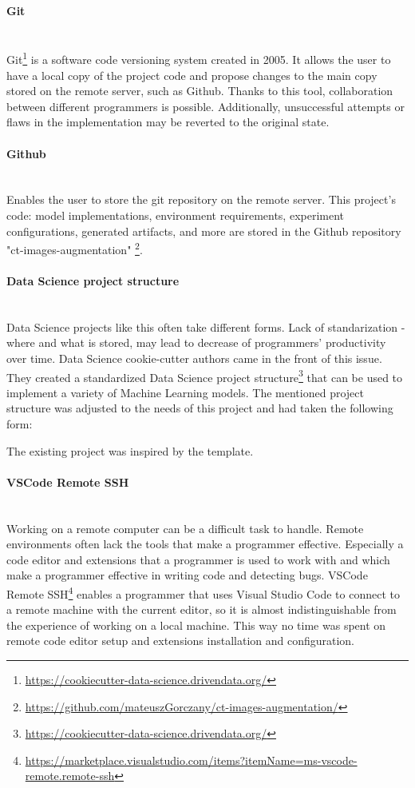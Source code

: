 \paragraph{Git}\mbox{}\\
\indent Git\footnote{\url{https://cookiecutter-data-science.drivendata.org/}} is a software code versioning system created in 2005. It allows the user to have a local copy of the project code and propose changes to the main copy stored on the remote server, such as Github. Thanks to this tool, collaboration between different programmers is possible. Additionally, unsuccessful attempts or flaws in the implementation may be reverted to the original state.
\paragraph{Github}\mbox{}\\
\indent Enables the user to store the git repository on the remote server. 
This project's code: model implementations, environment requirements, experiment configurations, generated artifacts, and more are stored in the Github repository "ct-images-augmentation" \footnote{\url{https://github.com/mateuszGorczany/ct-images-augmentation/}}.
\paragraph{Data Science project structure}\mbox{}\\
\indent Data Science projects like this often take different forms. Lack of standarization - where and what is stored, may lead to decrease of programmers' productivity over time. Data Science cookie-cutter authors came in the front of this issue. They created a standardized Data Science project structure\footnote{\url{https://cookiecutter-data-science.drivendata.org/}} that can be used to implement a variety of Machine Learning models. 
The mentioned project structure was adjusted to the needs of this project and had taken the following form:




The existing project was inspired by the template.
\paragraph{VSCode Remote SSH}\mbox{}\\
\indent Working on a remote computer can be a difficult task to handle. Remote environments often lack the tools that make a programmer effective. Especially a code editor and extensions that a programmer is used to work with and which make a programmer effective in writing code and detecting bugs. VSCode Remote SSH\footnote{\url{https://marketplace.visualstudio.com/items?itemName=ms-vscode-remote.remote-ssh}} enables a programmer that uses Visual Studio Code to connect to a remote machine with the current editor, so it is almost indistinguishable from the experience of working on a local machine. This way no time was spent on remote code editor setup and extensions installation and configuration. 

